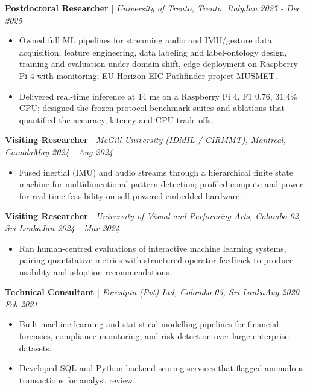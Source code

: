 \documentclass[11pt]{article}
\newenvironment{cvrole}[5]{%
  \par\noindent\textbf{\large #1} | \textit{\small #2, #3}\hfill \textit{\small #4 - #5}\par
  \begin{itemize}[leftmargin=2em, itemsep=-0.3em, topsep=-0.5em]%
}{%
  \end{itemize}\par\noindent\mbox{}\par\vspace{0.1em}%
}
\begin{document}
\begin{cvrole}{Postdoctoral Researcher}{University of Trento}{Trento, Italy}{Jan 2025}{Dec 2025}
    \item Owned full ML pipelines for streaming audio and IMU/gesture data: acquisition, feature engineering, data labeling and label-ontology design, training and evaluation under domain shift, edge deployment on Raspberry Pi 4 with monitoring; EU Horizon EIC Pathfinder project MUSMET.
    
    \item Delivered real-time inference at 14 ms on a Raspberry Pi 4, F1 0.76, 31.4\% CPU; designed the frozen-protocol benchmark suites and ablations that quantified the accuracy, latency and CPU trade-offs.
\end{cvrole}

\begin{cvrole}{Visiting Researcher}{McGill University (IDMIL / CIRMMT)}{Montreal, Canada}{May 2024}{Aug 2024}
    \item Fused inertial (IMU) and audio streams through a hierarchical finite state machine for multidimentional pattern detection; profiled compute and power for real-time feasibility on self-powered embedded hardware.
\end{cvrole}

\begin{cvrole}{Visiting Researcher}{University of Visual and Performing Arts}{Colombo 02, Sri Lanka}{Jan 2024}{Mar 2024}
    \item Ran human-centred evaluations of interactive machine learning systems, pairing quantitative metrics with structured operator feedback to produce usability and adoption recommendations.
\end{cvrole}

\begin{cvrole}{Technical Consultant}{Forestpin (Pvt) Ltd}{Colombo 05, Sri Lanka}{Aug 2020}{Feb 2021}
    \item Built machine learning and statistical modelling pipelines for financial forensics, compliance monitoring, and risk detection over large enterprise datasets.
    \item Developed SQL and Python backend scoring services that flagged anomalous transactions for analyst review.
\end{cvrole}
\end{document}
